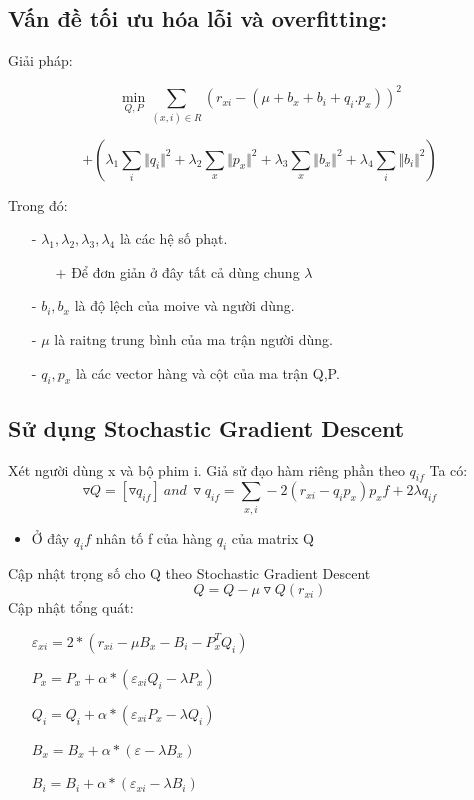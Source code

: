\documentclass[a4paper,10pt]{report}
\begin{document}
\subsection{Vấn đề tối ưu hóa lỗi và overfitting:}
Giải pháp:
\begin{flushleft}
\begin{displaymath}
\displaystyle \min_{Q,P} \sum_{(x,i)\in R}(r_{xi} - (\mu + b_x + b_i + q_i.p_x))^2
\end{displaymath}
\end{flushleft}
\begin{center}
\begin{displaymath}
\displaystyle
+ (\lambda_1\sum_{i}\Vert q_i \Vert^{2} + \lambda_2\sum_x\Vert p_x \Vert^2 + \lambda_3\sum_x\Vert b_x \Vert^2 + \lambda_4\sum_i\Vert b_i \Vert^2)
\end{displaymath}
\end{center}
Trong đó:
\begin{itemize}
\item[-] $\lambda_1,\lambda_2,\lambda_3,\lambda_4$ là các hệ số phạt.
\begin{itemize}
\item[+] Để đơn giản ở đây tất cả dùng chung $\lambda$
\end{itemize}
\item[-] $b_i,b_x$ là độ lệch của moive và người dùng.
\item[-] $\mu$ là raitng trung bình của ma trận người dùng.
\item[-] $q_i,p_x$ là các vector hàng và cột của ma trận Q,P.
\end{itemize}
\newpage
\subsection{Sử dụng Stochastic Gradient Descent}
Xét người dùng x và bộ phim i. Giả sử đạo hàm riêng phần theo $q_{if}$ Ta có:
\begin{displaymath}
\triangledown Q = [\triangledown q_{if}] \  and  \ 
\triangledown q_{if} = \sum_{x,i} - 2(r_{xi} - q_ip_x)p_xf + 2\lambda q_{if}
\end{displaymath}
\begin{itemize}
\item Ở đây $q_if$ nhân tố f của hàng $q_i$ của matrix Q
\end{itemize}
Cập nhật trọng số cho Q theo Stochastic Gradient Descent
\begin{displaymath}
Q = Q - \mu \triangledown Q(r_{xi})
\end{displaymath}
Cập nhật tổng quát:
\begin{itemize}
\item[] $\varepsilon_{xi} = 2*(r_{xi} - \mu B_x - B_i - P_x^TQ_i)$
\item[] $P_x = P_x + \alpha *(\varepsilon_{xi}Q_i - \lambda P_x)$
\item[] $Q_i = Q_i + \alpha *(\varepsilon_{xi}P_x - \lambda Q_i)$
\item[] $B_x = B_x + \alpha *(\varepsilon - \lambda B_x)$
\item[] $B_i = B_i + \alpha *(\varepsilon_{xi} - \lambda B_i)$
\end{itemize}
\end{document}
